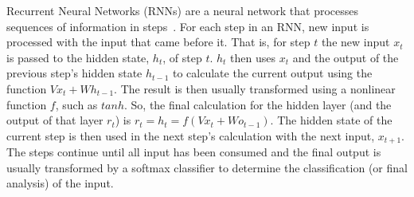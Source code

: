 Recurrent Neural Networks (RNNs) are a neural network that processes sequences of information in steps~\cite{elman1990finding}. For each step in an RNN, new input is processed with the input that came before it. That is, for step $t$ the new input $x_t$ is passed to the hidden state, $h_t$, of step $t$. $h_t$ then uses $x_t$ and the output of the previous step's hidden state $h_{t-1}$ to calculate the current output using the function $Vx_t + Wh_{t-1}$. The result is then usually transformed using a nonlinear function $f$, such as $tanh$. So, the final calculation for the hidden layer (and the output of that layer $r_t$) is $r_t = h_t = f(Vx_t + Wo_{t-1})$. The hidden state of the current step is then used in the next step's calculation with the next input, $x_{t+1}$. The steps continue until all input has been consumed and the final output is usually transformed by a softmax classifier to determine the classification (or final analysis) of the input.
